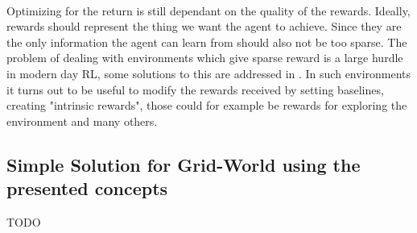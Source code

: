 \noindent
\\ Optimizing for the return is still dependant on the quality of the rewards. Ideally, rewards should represent the thing we want the agent to achieve. Since they are the only information the agent can learn from should also not be too sparse. The problem of dealing with environments which give sparse reward is a large hurdle in modern day RL, some solutions to this are addressed in . In such environments it turns out to be useful to modify the rewards received by setting baselines, creating "intrinsic rewards", those could for example be rewards for exploring the environment and many others. 

\subsection{Simple Solution for Grid-World using the presented concepts}
TODO


